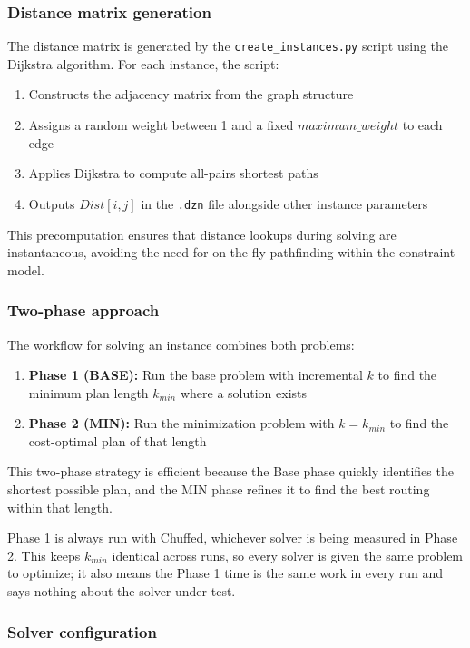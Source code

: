 \documentclass[a4paper,12pt]{article}
\begin{document}
\subsubsection{Distance matrix generation}

The distance matrix is generated by the \texttt{create\_instances.py} script using the Dijkstra algorithm. For each instance, the script:
\begin{enumerate}
    \item Constructs the adjacency matrix from the graph structure
    \item Assigns a random weight between 1 and a fixed $maximum\_weight$ to each edge
    \item Applies Dijkstra to compute all-pairs shortest paths
    \item Outputs $Dist[i, j]$ in the \texttt{.dzn} file alongside other instance parameters
\end{enumerate}
This precomputation ensures that distance lookups during solving are instantaneous, avoiding the need for on-the-fly pathfinding within the constraint model.

\subsubsection{Two-phase approach}
\label{sec:two-phase}

The workflow for solving an instance combines both problems:
\begin{enumerate}
    \item \textbf{Phase 1 (BASE):} Run the base problem with incremental $k$ to find the minimum plan length $k_{min}$ where a solution exists
    \item \textbf{Phase 2 (MIN):} Run the minimization problem with $k = k_{min}$ to find the cost-optimal plan of that length
\end{enumerate}
This two-phase strategy is efficient because the Base phase quickly identifies the shortest possible plan, and the MIN phase refines it to find the best routing within that length.

Phase 1 is always run with Chuffed, whichever solver is being measured in Phase 2. This keeps $k_{min}$ identical across runs, so every solver is given the same problem to optimize; it also means the Phase 1 time is the same work in every run and says nothing about the solver under test.

\subsubsection{Solver configuration}
\end{document}
